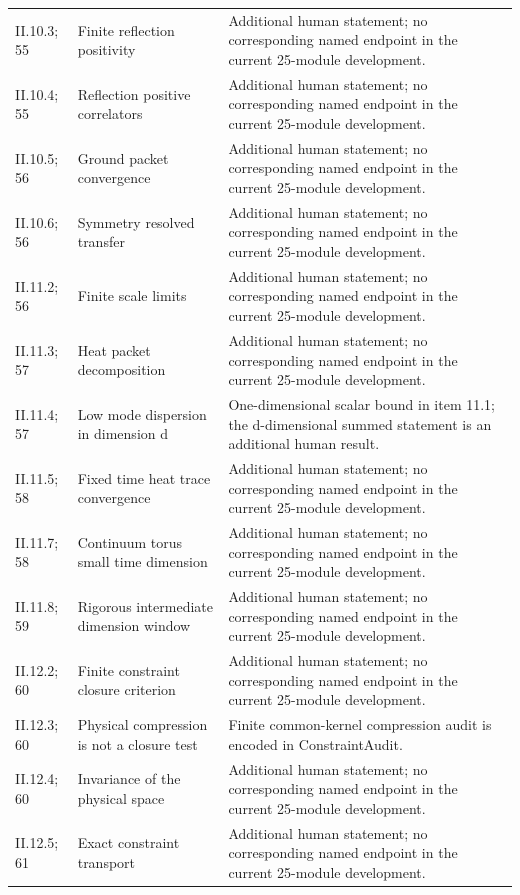 \begin{longtable}{@{}p{.13\linewidth}p{.34\linewidth}p{.46\linewidth}@{}}
II.10.3; 55 & Finite reflection positivity & Additional human statement; no corresponding named endpoint in the current 25-module development.\\
II.10.4; 55 & Reflection positive correlators & Additional human statement; no corresponding named endpoint in the current 25-module development.\\
II.10.5; 56 & Ground packet convergence & Additional human statement; no corresponding named endpoint in the current 25-module development.\\
II.10.6; 56 & Symmetry resolved transfer & Additional human statement; no corresponding named endpoint in the current 25-module development.\\
II.11.2; 56 & Finite scale limits & Additional human statement; no corresponding named endpoint in the current 25-module development.\\
II.11.3; 57 & Heat packet decomposition & Additional human statement; no corresponding named endpoint in the current 25-module development.\\
II.11.4; 57 & Low mode dispersion in dimension d & One-dimensional scalar bound in item 11.1; the d-dimensional summed statement is an additional human result.\\
II.11.5; 58 & Fixed time heat trace convergence & Additional human statement; no corresponding named endpoint in the current 25-module development.\\
II.11.7; 58 & Continuum torus small time dimension & Additional human statement; no corresponding named endpoint in the current 25-module development.\\
II.11.8; 59 & Rigorous intermediate dimension window & Additional human statement; no corresponding named endpoint in the current 25-module development.\\
II.12.2; 60 & Finite constraint closure criterion & Additional human statement; no corresponding named endpoint in the current 25-module development.\\
II.12.3; 60 & Physical compression is not a closure test & Finite common-kernel compression audit is encoded in ConstraintAudit.\\
II.12.4; 60 & Invariance of the physical space & Additional human statement; no corresponding named endpoint in the current 25-module development.\\
II.12.5; 61 & Exact constraint transport & Additional human statement; no corresponding named endpoint in the current 25-module development.\\

\end{longtable}
